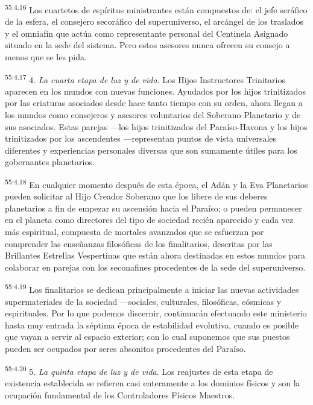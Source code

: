 \par
\textsuperscript{55:4.16} Los cuartetos de espíritus ministrantes están compuestos de: el jefe seráfico de la esfera, el consejero secoráfico del superuniverso, el arcángel de los traslados y el omniafín que actúa como representante personal del Centinela Asignado situado en la sede del sistema. Pero estos asesores nunca ofrecen su consejo a menos que se les pida.

\par
\textsuperscript{55:4.17} 4. \textit{La cuarta etapa de luz y de vida}. Los Hijos Instructores Trinitarios aparecen en los mundos con nuevas funciones. Ayudados por los hijos trinitizados por las criaturas asociados desde hace tanto tiempo con su orden, ahora llegan a los mundos como consejeros y asesores voluntarios del Soberano Planetario y de sus asociados. Estas parejas ---los hijos trinitizados del Paraíso-Havona y los hijos trinitizados por los ascendentes ---representan puntos de vista universales diferentes y experiencias personales diversas que son sumamente útiles para los gobernantes planetarios.

\par
\textsuperscript{55:4.18} En cualquier momento después de esta época, el Adán y la Eva Planetarios pueden solicitar al Hijo Creador Soberano que los libere de sus deberes planetarios a fin de empezar su ascensión hacia el Paraíso; o pueden permanecer en el planeta como directores del tipo de sociedad recién aparecido y cada vez más espiritual, compuesta de mortales avanzados que se esfuerzan por comprender las enseñanzas filosóficas de los finalitarios, descritas por las Brillantes Estrellas Vespertinas que están ahora destinadas en estos mundos para colaborar en parejas con los seconafines procedentes de la sede del superuniverso.

\par
\textsuperscript{55:4.19} Los finalitarios se dedican principalmente a iniciar las nuevas actividades supermateriales de la sociedad ---sociales, culturales, filosóficas, cósmicas y espirituales. Por lo que podemos discernir, continuarán efectuando este ministerio hasta muy entrada la séptima época de estabilidad evolutiva, cuando es posible que vayan a servir al espacio exterior; con lo cual suponemos que sus puestos pueden ser ocupados por seres absonitos procedentes del Paraíso.

\par
\textsuperscript{55:4.20} 5. \textit{La quinta etapa de luz y de vida}. Los reajustes de esta etapa de existencia establecida se refieren casi enteramente a los dominios físicos y son la ocupación fundamental de los Controladores Físicos Maestros.

